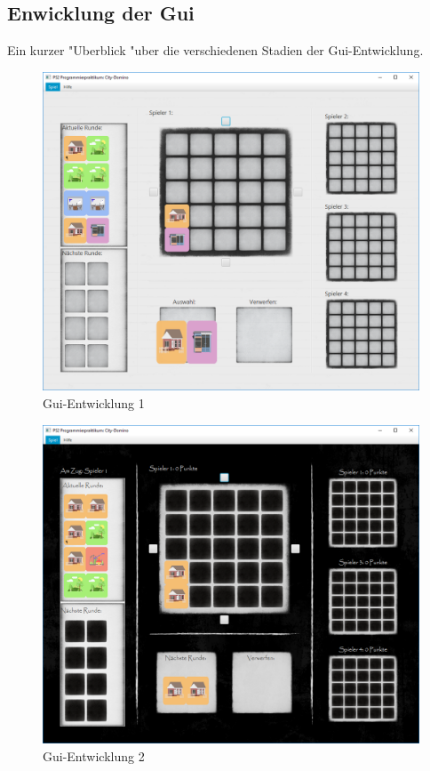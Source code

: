 \subsection{Enwicklung der Gui}
\FloatBarrier
Ein kurzer "Uberblick "uber die verschiedenen Stadien der Gui-Entwicklung.

\bigbreak
\bigbreak
\bigbreak
\bigbreak

\begin{figure}[h!]
	\centering
	\includegraphics{anhang/pics/180918}
	\caption{Gui-Entwicklung 1}
	\label{fig:guiEnwicklung1}
\end{figure}

\begin{figure}
	\centering
	\includegraphics[width=0.75\linewidth]{anhang/pics/200918}
	\caption{Gui-Entwicklung 2}
	\label{fig:guiEnwicklung2}
\end{figure}

